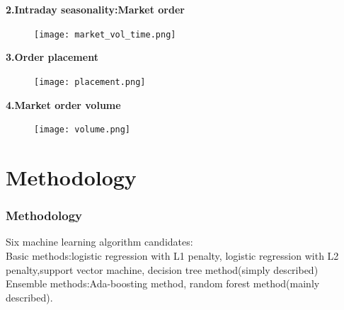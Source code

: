 \documentclass[xcolor={x11names,svgnames,dvipsnames}]{beamer}
\begin{document}
\begin{frame}
\textbf{2.Intraday seasonality:Market order}


\begin{figure}
		\texttt{[image: market\_vol\_time.png]}
	\end{figure}
\end{frame}

\begin{frame}
\textbf{3.Order placement}

\begin{figure}
		\texttt{[image: placement.png]}
	\end{figure}
\end{frame}

\begin{frame}
\textbf{4.Market order volume}

\begin{figure}
		\texttt{[image: volume.png]}
	\end{figure}
\end{frame}



\section{Methodology}
\begin{frame}
\frametitle{Methodology}
Six machine learning algorithm candidates:\\
 \vspace{1cm}
Basic methods:logistic regression with L1 penalty, logistic regression with L2 penalty,support vector machine, decision tree method(simply described)\\
\vspace{1cm}
Ensemble methods:Ada-boosting method, random forest method(mainly described).


\end{frame}
\end{document}
